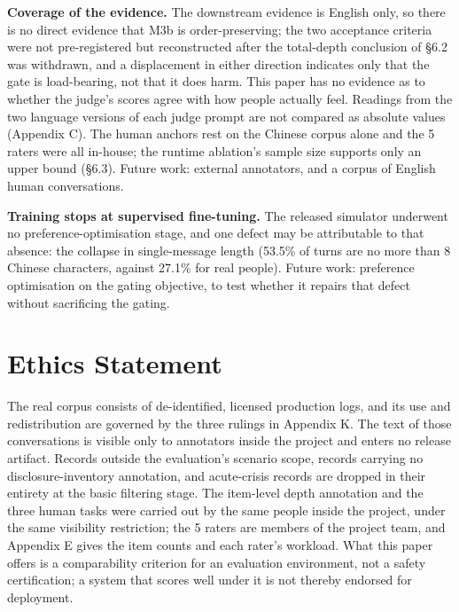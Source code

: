 \documentclass[letterpaper]{article}
\begin{document}
\textbf{Coverage of the evidence.} The downstream evidence is English only, so there is no direct evidence that M3b is order-preserving; the two acceptance criteria were not pre-registered but reconstructed after the total-depth conclusion of \S{}6.2 was withdrawn, and a displacement in either direction indicates only that the gate is load-bearing, not that it does harm. This paper has no evidence as to whether the judge's scores agree with how people actually feel. Readings from the two language versions of each judge prompt are not compared as absolute values (Appendix C). The human anchors rest on the Chinese corpus alone and the 5 raters were all in-house; the runtime ablation's sample size supports only an upper bound (\S{}6.3). Future work: external annotators, and a corpus of English human conversations.

\textbf{Training stops at supervised fine-tuning.} The released simulator underwent no preference-optimisation stage, and one defect may be attributable to that absence: the collapse in single-message length (53.5\% of turns are no more than 8 Chinese characters, against 27.1\% for real people). Future work: preference optimisation on the gating objective, to test whether it repairs that defect without sacrificing the gating.


\section*{Ethics Statement}


The real corpus consists of de-identified, licensed production logs, and its use and redistribution are governed by the three rulings in Appendix K. The text of those conversations is visible only to annotators inside the project and enters no release artifact. Records outside the evaluation's scenario scope, records carrying no disclosure-inventory annotation, and acute-crisis records are dropped in their entirety at the basic filtering stage. The item-level depth annotation and the three human tasks were carried out by the same people inside the project, under the same visibility restriction; the 5 raters are members of the project team, and Appendix E gives the item counts and each rater's workload. What this paper offers is a comparability criterion for an evaluation environment, not a safety certification; a system that scores well under it is not thereby endorsed for deployment.





\end{document}
